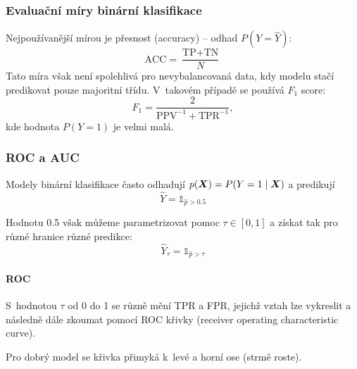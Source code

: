 \subsubsection{Evaluační míry binární klasifikace}

Nejpoužívanější mírou je přesnost (accuracy) -- odhad $P(Y = \hat{Y})$:
\[\text{ACC} = \frac{\text{TP} + \text{TN}}{N}\]
Tato míra však není spolehlivá pro nevybalancovaná data, kdy modelu stačí predikovat pouze majoritní třídu. V~takovém případě se používá $F_1$ score:
\[F_1 = \frac{2}{\text{PPV}^{-1} + \text{TPR}^{-1}},\]
kde hodnota $P(Y=1)$ je velmi malá.

\subsubsection{ROC a AUC}

Modely binární klasifikace často odhadují $p(\bm{X}) = P(Y = 1 \mid \bm{X})$ a predikují
\[\hat{Y} = \mathds{1}_{\hat{p} > 0.5}\]

Hodnotu 0.5 však můžeme parametrizovat pomoc $\tau \in [0, 1]$ a získat tak pro různé hranice různé predikce:
\[\hat{Y}_\tau = \mathds{1}_{\hat{p} > \tau}\]

\paragraph{ROC}

S~hodnotou $\tau$ od 0 do 1 se různě mění TPR a FPR, jejichž vztah lze vykreslit a následně dále zkoumat pomocí ROC křivky (receiver operating characteristic curve).
\begin{center}
    \small
\end{center}
Pro dobrý model se křivka přimyká k~levé a horní ose (strmě roste).

